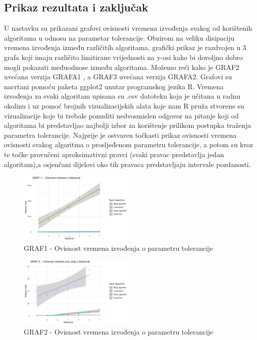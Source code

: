 \documentclass[conference]{IEEEtran}
\begin{document}
\subsection{Prikaz rezultata i zaključak}
U nastavku su prikazani grafovi ovisnosti vremena izvođenja svakog od korištenih algoritama u odnosu na parametar tolerancije. Obzirom na veliku disipaciju vremena izvođenja između različitih algoritama, grafički prikaz je razdvojen u 3 grafa koji imaju različito limitirane vrijednosti na y-osi kako bi dovoljno dobro mogli pokazati međuodnose između algoritama. Možemo reći kako je GRAF2 uvećana verzija GRAFA1 , a GRAF3 uvećana verzija GRAFA2.
Grafovi su nacrtani pomoću paketa ggplot2 unutar programskog jezika R. Vremena izvođenja za svaki algoritam upisana su .csv datoteku koja je učitana u radnu okolinu i uz pomoć brojnih vizualizacijskih alata koje nam R pruža stvorene su vizualizacije koje bi trebale ponuditi nedvosmislen odgovor na pitanje koji od algoritama bi predstavljao najbolji izbor za korištenje prilikom postupka traženja parametra tolerancije. Najprije je ostvaren točkasti prikaz ovisnosti vremena ovisnosti svakog algoritma o prosljeđenom parametru tolerancije, a potom su kroz te točke provučeni aproksimativni pravci (svaki pravac predstavlja jedan algoritam),a osjenčani dijelovi oko tih pravaca predstavljaju intervale pozdanosti.

\begin{figure}[htbp]
\centerline{\includegraphics[width=0.5\textwidth]{Grafovi_i_csv_datoteke/GRAF1.png}}
\caption{GRAF1 - Ovisnost vremena izvođenja o parametru tolerancije}
\label{fig}
\end{figure}



\begin{figure}[htbp]
\centerline{\includegraphics[width=0.5\textwidth]{Grafovi_i_csv_datoteke/GRAF2.png}}
\caption{GRAF2 - Ovisnost vremena izvođenja o parametru tolerancije}
\label{fig}
\end{figure}
\end{document}
